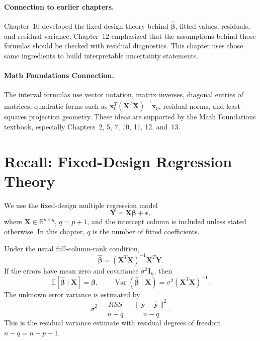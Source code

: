 \paragraph{Connection to earlier chapters.}
Chapter~10 developed the fixed-design theory behind \(\widehat{\boldsymbol{\beta}}\), fitted values, residuals, and residual variance.  Chapter~12 emphasized that the assumptions behind those formulas should be checked with residual diagnostics.  This chapter uses those same ingredients to build interpretable uncertainty statements.

\paragraph{Math Foundations Connection.}
The interval formulas use vector notation, matrix inverses, diagonal entries of matrices, quadratic forms such as \(\mathbf{x}_0^T(\mathbf{X}^T\mathbf{X})^{-1}\mathbf{x}_0\), residual norms, and least-squares projection geometry.  These ideas are supported by the Math Foundations textbook, especially Chapters~2, 5, 7, 10, 11, 12, and~13.

\section{Recall: Fixed-Design Regression Theory}

We use the fixed-design multiple regression model
\begin{equation}
  \mathbf{Y}=\mathbf{X}\boldsymbol{\beta}+\boldsymbol{\epsilon},
  \label{eq:ch13-fixed-design-model}
\end{equation}
where \(\mathbf{X}\in\mathbb{R}^{n\times q}\), \(q=p+1\), and the intercept column is included unless stated otherwise.  In this chapter, \(q\) is the number of fitted coefficients.

Under the usual full-column-rank condition,
\begin{equation}
  \widehat{\boldsymbol{\beta}}
  = (\mathbf{X}^T\mathbf{X})^{-1}\mathbf{X}^T\mathbf{Y}.
\end{equation}
If the errors have mean zero and covariance \(\sigma^2\mathbf{I}_n\), then
\begin{equation}
  \mathbb{E}[\widehat{\boldsymbol{\beta}}\mid \mathbf{X}]
  =\boldsymbol{\beta},
  \qquad
  \operatorname{Var}(\widehat{\boldsymbol{\beta}}\mid \mathbf{X})
  =\sigma^2(\mathbf{X}^T\mathbf{X})^{-1}.
  \label{eq:ch13-beta-var}
\end{equation}
The unknown error variance is estimated by
\begin{equation}
  \widehat{\sigma}^2
  =\frac{RSS}{n-q}
  =\frac{\|\mathbf{y}-\widehat{\mathbf{y}}\|^2}{n-q}.
  \label{eq:ch13-sigma-hat}
\end{equation}
This is the residual variance estimate with residual degrees of freedom \(n-q=n-p-1\).

